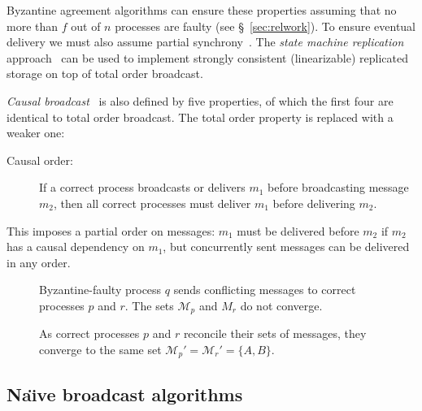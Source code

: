 \documentclass[a4paper,anonymous,USenglish]{lipics-v2019}
\begin{document}
Byzantine agreement algorithms can ensure these properties assuming that no more than $f$ out of $n$ processes are faulty (see \S~\ref{sec:relwork}).
To ensure eventual delivery we must also assume partial synchrony~\cite{Dwork:1988}.
The \emph{state machine replication} approach~\cite{Schneider:1990} can be used to implement strongly consistent (linearizable) replicated storage on top of total order broadcast.

\emph{Causal broadcast}~\cite{Birman:1991el,Cachin:2011wt} is also defined by five properties, of which the first four are identical to total order broadcast.
The total order property is replaced with a weaker one:

\begin{description}
\item[Causal order:] If a correct process broadcasts or delivers $m_1$ before broadcasting message $m_2$, then all correct processes must deliver $m_1$ before delivering $m_2$.
\end{description}

This imposes a partial order on messages: $m_1$ must be delivered before $m_2$ if $m_2$ has a causal dependency on $m_1$, but concurrently sent messages can be delivered in any order.

\begin{figure}
\centering
\begin{minipage}{.5\textwidth}
    \centering
    
    \captionsetup{width=.95\linewidth}
    \caption{Byzantine-faulty process $q$ sends conflicting messages to correct processes $p$ and $r$.
    The sets $\mathcal{M}_p$ and ${M}_r$ do not converge.}
    \label{fig:trivial1}
\end{minipage}%
\begin{minipage}{.5\textwidth}
    \centering
    
    \captionsetup{width=.95\linewidth}
    \caption{As correct processes $p$ and $r$ reconcile their sets of messages, they converge to the same set $\mathcal{M}_p' = \mathcal{M}_r' = \{A,B\}$.}
    \label{fig:trivial2}
\end{minipage}
\end{figure}

\subsection{Na\"{\i}ve broadcast algorithms}
\end{document}
